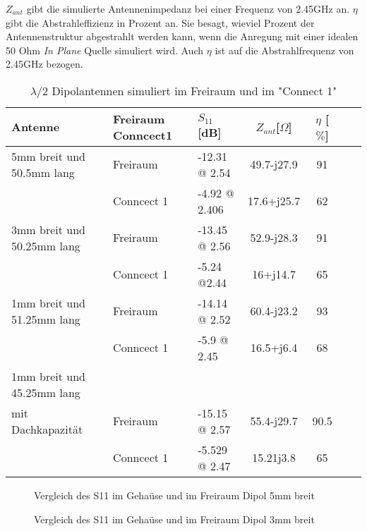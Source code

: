 $Z_{ant}$ gibt die simulierte Antennenimpedanz bei einer Frequenz von 2.45GHz an.
$\eta$ gibt die Abstrahleffizienz in Prozent an. Sie besagt, wieviel Prozent der Antennenstruktur abgestrahlt werden kann, wenn die Anregung mit einer idealen 50 Ohm \textit{In Plane} Quelle simuliert wird. Auch $\eta$ ist auf die Abstrahlfrequenz von 2.45GHz bezogen.

\begin{table}[h!]
  \centering
  \begin{tabular}{p{4cm} p{2cm} l c c c r} 
  \toprule 
  Antenne                  	& Freiraum Conncect1	 & $S_{11}$[dB]	& $Z_{ant}$[$\Omega$] 	& $\eta$ [$\%$]\\ 
  \midrule
 5mm breit und 50.5mm lang    	& Freiraum			&	-12.31 @ 2.54		&  	49.7-j27.9		&   	91	\\
            					& Conncect 1   			&   -4.92 @ 2.406   		&	17.6+j25.7		& 	62	\\
 3mm breit und 50.25mm lang    & Freiraum			&    -13.45 @ 2.56  		&	52.9-j28.3		&	91	\\
     						& Conncect 1				&  	-5.24 @2.44			&	16+j14.7			&	65	\\
 1mm breit und 51.25mm lang  	& Freiraum			&    -14.14 @ 2.52    	&	60.4-j23.2		&	93	\\
      						& Conncect 1				&  	-5.9 @ 2.45			&	16.5+j6.4		&	68	\\
  1mm breit und 45.25mm lang \\
  mit Dachkapazität  		& Freiraum				&   -15.15 @ 2.57      	&	55.4-j29.7		&	90.5	\\
      						& Conncect 1				&  	-5.529 @ 2.47		&	15.21j3.8		&	65	\\
 \bottomrule
  \end{tabular}
  \caption{$\lambda/2$ Dipolantennen simuliert im Freiraum und im "Connect 1"}
  \label{tab:Vergeich_Lambda/2_Freiraum_Geraet}
\end{table}
\begin{figure}[!h]
	\centering
	\begingroup
	\endgroup
	\caption{Vergleich des S11 im Gehaüse und im Freiraum Dipol 5mm breit}
	\label{S11_Vergleich_Simulation_5mm}
\end{figure}

\begin{figure}[!h]
	\centering
	\begingroup
	\endgroup
	\caption{Vergleich des S11 im Gehaüse und im Freiraum Dipol 3mm breit}
	\label{S11_Vergleich_Simulation_3mm}
\end{figure}

